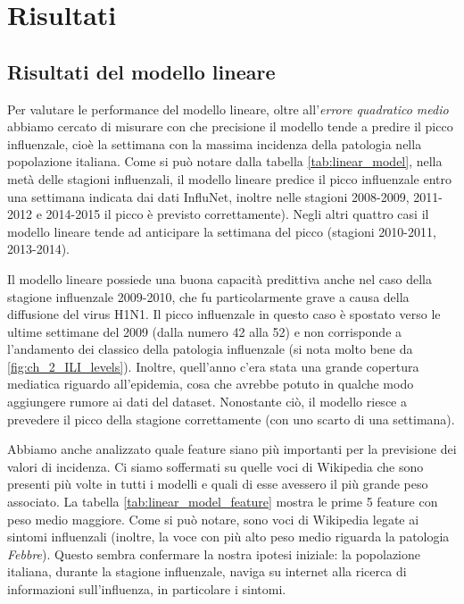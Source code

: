 \chapter{Risultati}
\bigskip

\section{Risultati del modello lineare}
\bigskip

Per valutare le performance del modello lineare, oltre all'\textit{errore quadratico medio} abbiamo cercato di misurare con
che precisione il modello tende a predire il picco influenzale, cioè la settimana con la massima incidenza della patologia 
nella popolazione italiana. Come si può notare dalla tabella \ref{tab:linear_model}, nella metà delle stagioni influenzali, 
il modello lineare predice il picco influenzale entro una settimana indicata dai dati InfluNet, inoltre nelle stagioni 
2008-2009, 2011-2012 e 2014-2015 il picco è previsto correttamente). Negli altri quattro casi il modello lineare tende ad 
anticipare la settimana del picco (stagioni 2010-2011, 2013-2014).
\bigskip

Il modello lineare possiede una buona capacità predittiva anche nel caso della stagione influenzale 2009-2010, che fu 
particolarmente grave a causa della diffusione del virus H1N1. Il picco influenzale in questo caso è spostato verso le ultime
settimane del 2009 (dalla numero 42 alla 52) e non corrisponde a l'andamento dei classico della patologia influenzale (si 
nota molto bene da \ref{fig:ch_2_ILI_levels}). Inoltre, quell'anno c'era stata una grande copertura mediatica riguardo 
all'epidemia, cosa che avrebbe potuto in qualche modo aggiungere rumore ai dati del dataset. Nonostante ciò, il modello riesce a prevedere il picco della stagione correttamente (con uno scarto di una settimana).
\bigskip

Abbiamo anche analizzato quale feature siano più importanti per la previsione dei valori di incidenza. Ci siamo soffermati su 
quelle voci di Wikipedia che sono presenti più volte in tutti i modelli e quali di esse avessero il più grande peso 
associato. La tabella \ref{tab:linear_model_feature} mostra le prime 5 feature con peso medio maggiore. Come si può notare, 
sono voci di Wikipedia legate ai sintomi influenzali (inoltre, la voce con più alto peso medio riguarda la patologia 
\textit{Febbre}). Questo sembra confermare la nostra ipotesi iniziale: la popolazione italiana, durante la stagione 
influenzale, naviga su internet alla ricerca di informazioni sull'influenza, in particolare i sintomi. 
\bigskip

